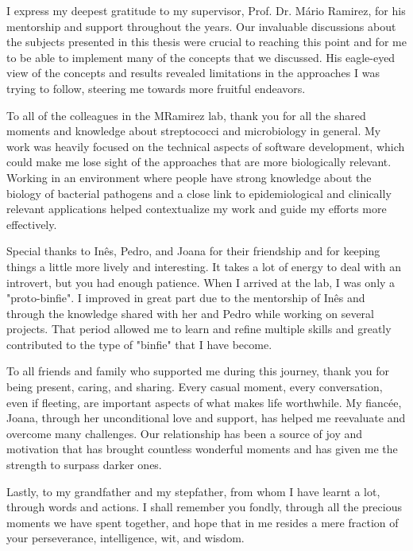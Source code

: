 I express my deepest gratitude to my supervisor, Prof. Dr. Mário Ramirez, for his mentorship and support throughout the years. Our invaluable discussions about the subjects presented in this thesis were crucial to reaching this point and for me to be able to implement many of the concepts that we discussed. His eagle-eyed view of the concepts and results revealed limitations in the approaches I was trying to follow, steering me towards more fruitful endeavors.

To all of the colleagues in the MRamirez lab, thank you for all the shared moments and knowledge about streptococci and microbiology in general. My work was heavily focused on the technical aspects of software development, which could make me lose sight of the approaches that are more biologically relevant. Working in an environment where people have strong knowledge about the biology of bacterial pathogens and a close link to epidemiological and clinically relevant applications helped contextualize my work and guide my efforts more effectively.

Special thanks to Inês, Pedro, and Joana for their friendship and for keeping things a little more lively and interesting. It takes a lot of energy to deal with an introvert, but you had enough patience. When I arrived at the lab, I was only a "proto-binfie". I improved in great part due to the mentorship of Inês and through the knowledge shared with her and Pedro while working on several projects. That period allowed me to learn and refine multiple skills and greatly contributed to the type of "binfie" that I have become.

To all friends and family who supported me during this journey, thank you for being present, caring, and sharing. Every casual moment, every conversation, even if fleeting, are important aspects of what makes life worthwhile. My fiancée, Joana, through her unconditional love and support, has helped me reevaluate and overcome many challenges. Our relationship has been a source of joy and motivation that has brought countless wonderful moments and has given me the strength to surpass darker ones.

Lastly, to my grandfather and my stepfather, from whom I have learnt a lot, through words and actions. I shall remember you fondly, through all the precious moments we have spent together, and hope that in me resides a mere fraction of your perseverance, intelligence, wit, and wisdom.

